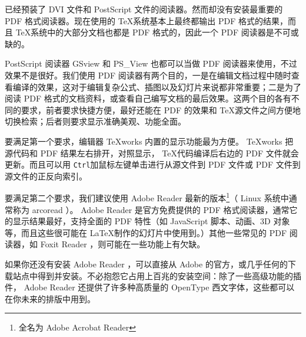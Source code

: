 \texlive 已经预装了 DVI 文件和 PostScript 文件的阅读器。然而却没有安装最重要的 PDF 格式阅读器。现在使用的 \TeX 系统基本上最终都输出 PDF 格式的结果，而且 \TeX 系统中的大部分文档也都是 PDF 格式的，因此一个 PDF 阅读器是不可或缺的。

PostScript 阅读器 GSview 和 PS\_View 也都可以当做 PDF 阅读器来使用，不过效果不是很好。我们使用 PDF 阅读器有两个目的，一是在编辑文档过程中随时查看编译的效果，这对于编辑复杂公式、插图以及幻灯片来说都非常重要；二是为了阅读 PDF 格式的文档资料，或查看自己编写文档的最后效果。这两个目的各有不同的要求，前者要求快捷方便，最好还能在 PDF 的效果和 \TeX 源文件之间方便地切换检索；后者则要求显示准确美观、功能全面。

要满足第一个要求，编辑器 TeXworks 内置的显示功能最为方便。 TeXworks 把源代码和 PDF 结果左右排开，对照显示， \TeX 代码编译后右边的 PDF 文件就会更新。而且可以用 \verb|Ctrl|加鼠标左键单击进行从源文件到 PDF 文件或 PDF 文件到源文件的正反向索引。

要满足第二个要求，我们建议使用 Adobe Reader 最新的版本\footnote{全名为 Adobe Acrobat Reader }（ Linux 系统中通常称为 arcoread ）。 Adobe Reader 是官方免费提供的 PDF 格式阅读器，通常它的显示结果最好，支持全面的 PDF 特性（如 JavaScript 脚本、动画、3D 对象等，而且这些很可能在 \LaTeX 制作的幻灯片中使用到。）其他一些常见的 PDF 阅读器，如 Foxit Reader ，则可能在一些功能上有欠缺。

如果你还没有安装 Adobe Reader ，可以直接从 Adobe 的官方，或几乎任何的下载站点中得到并安装。不必抱怨它占用上百兆的安装空间：除了一些高级功能的插件， Adobe Reader 还提供了许多种高质量的 OpenType 西文字体，这些都可以在你未来的排版中用到。

